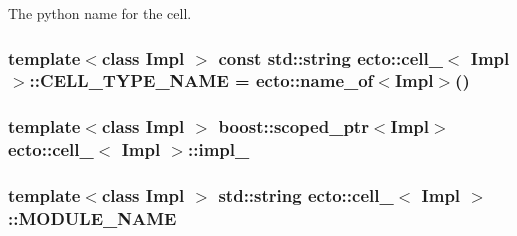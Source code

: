 \-The python name for the cell. 

\hypertarget{structecto_1_1cell___a26e158738e4e4c8f0ddb64efce30d8d3}{
\subsubsection[{\-C\-E\-L\-L\-\_\-\-T\-Y\-P\-E\-\_\-\-N\-A\-M\-E}]{\setlength{\rightskip}{0pt plus 5cm}template$<$class Impl $>$ const std\-::string {\bf ecto\-::cell\-\_\-}$<$ \-Impl $>$\-::{\bf \-C\-E\-L\-L\-\_\-\-T\-Y\-P\-E\-\_\-\-N\-A\-M\-E} = {\bf ecto\-::name\-\_\-of}$<$\-Impl$>$()}}\label{structecto_1_1cell___a26e158738e4e4c8f0ddb64efce30d8d3}
\hypertarget{structecto_1_1cell___a2984b78c1ed24aca6ee427502bd6e8c4}{
\subsubsection[{impl\-\_\-}]{\setlength{\rightskip}{0pt plus 5cm}template$<$class Impl $>$ boost\-::scoped\-\_\-ptr$<$\-Impl$>$ {\bf ecto\-::cell\-\_\-}$<$ \-Impl $>$\-::{\bf impl\-\_\-}}}\label{structecto_1_1cell___a2984b78c1ed24aca6ee427502bd6e8c4}
\hypertarget{structecto_1_1cell___ab81cf6649132223f620b739a57db04db}{
\subsubsection[{\-M\-O\-D\-U\-L\-E\-\_\-\-N\-A\-M\-E}]{\setlength{\rightskip}{0pt plus 5cm}template$<$class Impl $>$ std\-::string {\bf ecto\-::cell\-\_\-}$<$ \-Impl $>$\-::{\bf \-M\-O\-D\-U\-L\-E\-\_\-\-N\-A\-M\-E}}}\label{structecto_1_1cell___ab81cf6649132223f620b739a57db04db}


